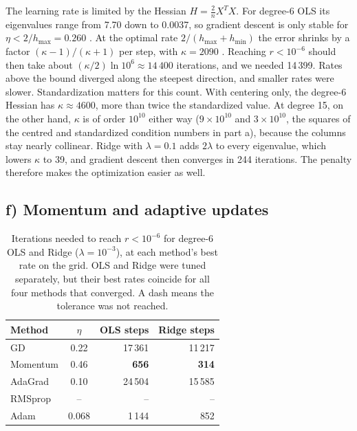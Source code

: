 \documentclass[aps,prb,reprint,superscriptaddress,nofootinbib,longbibliography,floatfix]{revtex4-2}
\begin{document}
The learning rate is limited by the Hessian $H=\frac2nX^TX$. For degree-6 OLS its eigenvalues range from 7.70 down to 0.0037, so gradient descent is only stable for $\eta<2/h_{\max}=0.260$ \cite[Eq.~(4.20)]{HjorthJensen2026}. At the optimal rate $2/(h_{\max}+h_{\min})$ the error shrinks by a factor $(\kappa-1)/(\kappa+1)$ per step, with $\kappa=2090$ \cite[Eq.~(4.26)]{HjorthJensen2026}. Reaching $r<10^{-6}$ should then take about $(\kappa/2)\ln 10^6\approx14\,400$ iterations, and we needed 14\,399. Rates above the bound diverged along the steepest direction, and smaller rates were slower. Standardization matters for this count. With centering only, the degree-6 Hessian has $\kappa\approx4600$, more than twice the standardized value. At degree 15, on the other hand, $\kappa$ is of order $10^{10}$ either way ($9\times10^{10}$ and $3\times10^{10}$, the squares of the centred and standardized condition numbers in part a), because the columns stay nearly collinear. Ridge with $\lambda=0.1$ adds $2\lambda$ to every eigenvalue, which lowers $\kappa$ to 39, and gradient descent then converges in 244 iterations. The penalty therefore makes the optimization easier as well.

\subsection{f) Momentum and adaptive updates}\label{sec:res_adaptive}
\begin{table}[tb]
\caption{Iterations needed to reach $r<10^{-6}$ for degree-6 OLS and Ridge ($\lambda=10^{-3}$), at each method's best rate on the grid. OLS and Ridge were tuned separately, but their best rates coincide for all four methods that converged. A dash means the tolerance was not reached.}\label{tab:opt}
\begin{ruledtabular}
\begin{tabular}{lcrr}
Method & $\eta$ & OLS steps & Ridge steps \\ \hline
GD & 0.22 & 17\,361 & 11\,217 \\
Momentum & 0.46 & \textbf{656} & \textbf{314} \\
AdaGrad & 0.10 & 24\,504 & 15\,585 \\
RMSprop & -- & -- & -- \\
Adam & 0.068 & 1\,144 & 852 \\
\end{tabular}
\end{ruledtabular}
\end{table}
\end{document}
